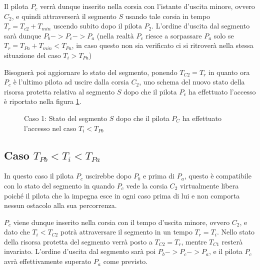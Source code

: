 \documentclass[a4paper,11pt, twoside, openright]{book}
\begin{document}
	Il pilota $P_{c}$ verrà dunque inserito nella corsia con l'istante d'uscita minore, ovvero $C_2$,
	e quindi attraverserà il segmento $S$ usando tale corsia in tempo $T_r = T_{c2} + T_{min}$
	uscendo subito dopo il pilota $P_2$. L'ordine d'uscita dal segmento sarà dunque $P_b -> P_c -> P_a$
	(nella realtà $P_c$ riesce a sorpassare $P_a$ solo se $T_r = T_{Pa} + T_{min} < T_{Pa}$, in caso questo non sia verificato
	ci si ritroverà nella stessa situazione del caso $T_i > T_{Pa}$)
	
	Bisognerà poi aggiornare lo stato del segmento, ponendo
	$T_{C2} = T_{r}$ in quanto ora $P_c$ è l'ultimo pilota ad uscire dalla corsia $C_2$, uno schema del
	nuovo stato della risorsa protetta relativa al
	segmento $S$ dopo che il pilota $P_c$ ha effettuato l'accesso è riportato nella figura \ref{fgr:AccessoSegmentiCaso1}.
	
	\begin{figure}[ht]
	  \centering
	  \caption{Caso 1: Stato del segmento $S$ dopo che il pilota $P_C$ ha effettuato l'accesso nel caso $T_i < T_{Pb}$}
	  \label{fgr:AccessoSegmentiCaso1}
	\end{figure}
	
      \subsection{Caso $T_{Pb} < T_i < T_{Pa}$}
	In questo caso il pilota $P_c$ uscirebbe dopo $P_b$ e prima di $P_a$, questo è compatibile con 
	lo stato del segmento in quando $P_c$ vede la corsia $C_2$ virtualmente libera poiché
	il pilota che la impegna esce in ogni caso prima di lui e non comporta nessun ostacolo alla sua percorrenza.
	
	$P_c$ viene dunque inserito nella corsia con il tempo d'uscita minore, ovvero $C_2$, e dato che
	$T_i < T_{C2}$ potrà attraversare il segmento in un tempo $T_r = T_i$. 
	Nello stato della risorsa protetta del segmento verrà posto a $T_{C2} = T_r$, mentre $T_{C1}$ resterà invariato.
	L'ordine d'uscita dal segmento sarà poi $P_b -> P_c -> P_a$, e il pilota $P_c$ avrà effettivamente 
	superato $P_a$ come previsto.
	
\end{document}
